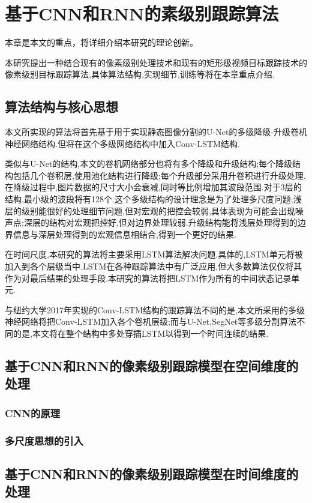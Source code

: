 \chapter{基于CNN和RNN的素级别跟踪算法}
本章是本文的重点，将详细介绍本研究的理论创新。
\par
本研究提出一种结合现有的像素级别处理技术和现有的矩形级视频目标跟踪技术的像素级别目标跟踪算法,具体算法结构,实现细节,训练等将在本章重点介绍.
\section{算法结构与核心思想}
本文所实现的算法将首先基于用于实现静态图像分割的U-Net\supercite{ronneberger2015u}的多级降级-升级卷机神经网络结构.但将在这个多级网络结构中加入Conv-LSTM结构.
\par
类似与U-Net的结构,本文的卷机网络部分也将有多个降级和升级结构;每个降级结构包括几个卷积层,使用池化结构进行降级;每个升级部分采用升卷积进行升级处理.在降级过程中,图片数据的尺寸大小会衰减,同时等比例增加其波段范围.对于3层的结构,最小级的波段将有128个.这个多级结构的设计理念是为了处理多尺度问题;浅层的级别能很好的处理细节问题,但对宏观的把控会较弱,具体表现为可能会出现噪声点;深层的结构对宏观把控好,但对边界处理较弱.升级结构能将浅层处理得到的边界信息与深层处理得到的宏观信息相结合,得到一个更好的结果.
\par
在时间尺度,本研究的算法将主要采用LSTM算法解决问题.具体的,LSTM单元将被加入到各个层级当中.LSTM在各种跟踪算法中有广泛应用,但大多数算法仅仅将其作为对最后结果的处理手段.本研究的算法将把LSTM作为所有的中间状态记录单元.
\par
与纽约大学2017年实现的Conv-LSTM结构的跟踪算法不同的是,本文所采用的多级神经网络将把Conv-LSTM加入各个卷机层级;而与U-Net,SegNet等多级分割算法不同的是,本文将在整个结构中多处穿插LSTM以得到一个时间连续的结果.
\section{基于CNN和RNN的像素级别跟踪模型在空间维度的处理}
\subsection{CNN的原理}
\subsection{多尺度思想的引入}
\section{基于CNN和RNN的像素级别跟踪模型在时间维度的处理}
